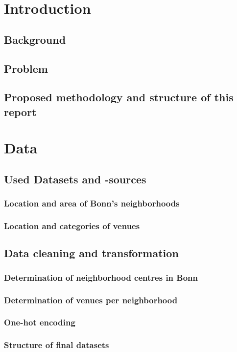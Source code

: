 \documentclass[UKenglish]{scrreprt}
\begin{document}
\chapter{Introduction}
\section{Background}
\section{Problem}
\section{Proposed methodology and structure of this report}

\chapter{Data}

\section{Used Datasets and -sources}

\subsection{Location and area of Bonn's neighborhoods}


\subsection{Location and categories of venues}

\section{Data cleaning and transformation}
\subsection{Determination of neighborhood centres in Bonn}
\subsection{Determination of venues per neighborhood}
\subsection{One-hot encoding}
\subsection{Structure of final datasets}
\end{document}

